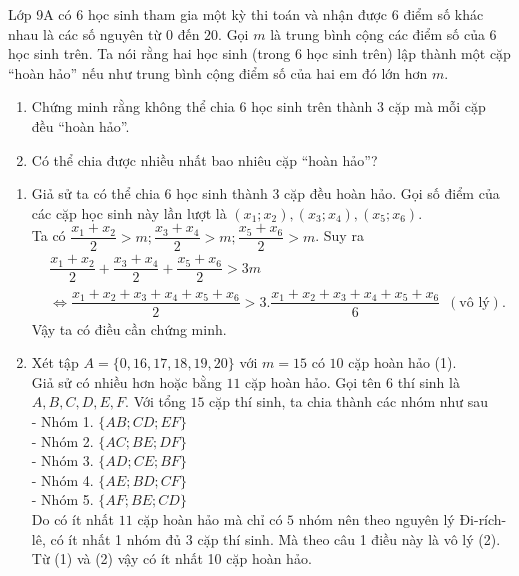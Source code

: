 \begin{ex}%
Lớp 9A có $6$ học sinh tham gia một kỳ thi toán và nhận được $6$ điểm số khác nhau là các số nguyên từ $0$ đến $20$. Gọi $m$ là trung bình cộng các điểm số của $6$ học sinh trên. Ta nói rằng hai học sinh (trong $6$ học sinh trên) lập thành một cặp “hoàn hảo” nếu như trung bình cộng điểm số của hai em đó lớn hơn $m$.
\begin{enumerate}
\item Chứng minh rằng không thể chia $6$ học sinh trên thành $3$ cặp mà mỗi cặp đều “hoàn hảo”.
\item Có thể chia được nhiều nhất bao nhiêu cặp “hoàn hảo”?
\end{enumerate}
\loigiai
    {
  \begin{enumerate}
\item  Giả sử ta có thể chia $6$ học sinh thành $3$ cặp đều hoàn hảo. Gọi số điểm của các cặp học sinh này lần lượt là $(x_1;x_2), (x_3; x_4), (x_5;x_6)$.\\
Ta có $\dfrac{x_1+x_2}{2} >m; \dfrac{x_3+x_4}{2} >m; \dfrac{x_5+x_6}{2} >m $. Suy ra 
\[
\begin{aligned}
& \dfrac{x_1+x_2}{2} + \dfrac{x_3+x_4}{2} + \dfrac{x_5+x_6}{2} >3m \\
& \Leftrightarrow \dfrac{x_1+x_2+x_3+x_4+x_5+x_6}{2} > 3. \dfrac{ x_1+x_2+x_3+x_4+x_5+x_6}{6}\,\,\,(\text{vô lý}).
\end{aligned}
\]
Vậy ta có điều cần chứng minh.

\item Xét tập $A=\{0,16,17,18,19,20\}$ với $m=15$ có $10$ cặp hoàn hảo (1).\\
Giả sử có nhiều hơn hoặc bằng $11$ cặp hoàn hảo. Gọi tên $6$ thí sinh là $A, B, C, D, E, F$. Với tổng $15$ cặp thí sinh, ta chia thành các nhóm như sau\\
-	Nhóm 1. $\{AB; CD; EF\}$\\
-	Nhóm 2. $\{AC; BE; DF\}$\\
-	Nhóm 3. $\{AD; CE; BF\}$\\
-	Nhóm 4. $\{AE; BD; CF\}$\\
-	Nhóm 5. $\{AF; BE; CD\}$\\
Do có ít nhất $11$ cặp hoàn hảo mà chỉ có $5$ nhóm nên theo nguyên lý Đi-rích-lê, có ít nhất 1 nhóm đủ 3 cặp thí sinh. Mà theo câu 1 điều này là vô lý (2).\\
Từ (1) và (2) vậy có ít nhất 10 cặp hoàn hảo.

\end{enumerate}
    }
\end{ex}

